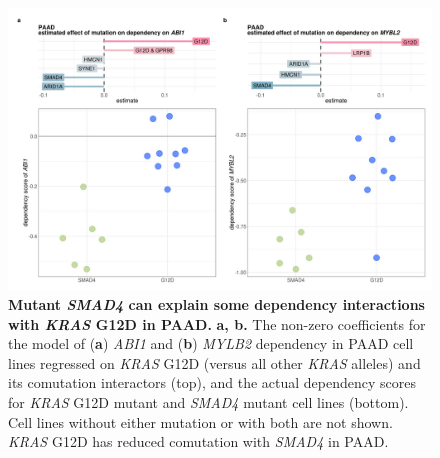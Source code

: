 \documentclass[english, 10pt, letterpaper]{article}
\newcommand{\KRAS}{\emph{KRAS}}
\begin{document}
\begin{figure}[h!]
\centering
\includegraphics[width=180mm]{figures/Supp_Fig_8.jpeg}
\caption{
    \textbf{Mutant \emph{SMAD4} can explain some dependency interactions with \KRAS{} G12D in PAAD.}
    \textbf{a, b.} The non-zero coefficients for the model of (\textbf{a}) \emph{ABI1} and (\textbf{b}) \emph{MYLB2} dependency in PAAD cell lines regressed on \KRAS{} G12D (versus all other \KRAS{} alleles) and its comutation interactors (top), and the actual dependency scores for \KRAS{} G12D mutant and \emph{SMAD4} mutant cell lines (bottom). Cell lines without either mutation or with both are not shown. \KRAS{} G12D has reduced comutation with \emph{SMAD4} in PAAD.
}
\label{sfig:dep-map-comut-masking}
\end{figure}
\newpage

\end{document}
